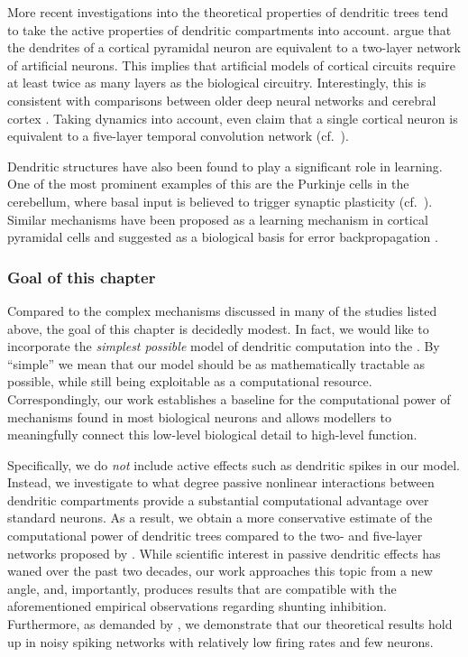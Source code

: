 More recent investigations into the theoretical properties of dendritic trees tend to take the active properties of dendritic compartments into account.
 argue that the dendrites of a cortical pyramidal neuron are equivalent to a two-layer network of artificial neurons.
This implies that artificial models of cortical circuits require at least twice as many layers as the biological circuitry.
Interestingly, this is consistent with comparisons between older deep neural networks and cerebral cortex \citep[e.g.,][]{guclu2015deep}.
Taking dynamics into account, \citet{beniaguev2021single} even claim that a single cortical neuron is equivalent to a five-layer temporal convolution network (cf.~).

Dendritic structures have also been found to play a significant role in learning.
One of the most prominent examples of this are the Purkinje cells in the cerebellum, where basal input is believed to trigger synaptic plasticity (cf.~).
Similar mechanisms have been proposed as a learning mechanism in cortical pyramidal cells and suggested as a biological basis for error backpropagation \citep{richards2019dendritic,richards2019deep}.

\subsubsection{Goal of this chapter}
Compared to the complex mechanisms discussed in many of the studies listed above, the goal of this chapter is decidedly modest.
In fact, we would like to incorporate the \emph{simplest possible} model of dendritic computation into the \NEF.
By \enquote{simple} we mean that our model should be as mathematically tractable as possible, while still being exploitable as a computational resource.
Correspondingly, our work establishes a baseline for the computational power of mechanisms found in most biological neurons and allows modellers to meaningfully connect this low-level biological detail to high-level function.

Specifically, we do \emph{not} include active effects such as dendritic spikes in our model.
Instead, we investigate to what degree passive nonlinear interactions between dendritic compartments provide a substantial computational advantage over standard \LIF neurons.
As a result, we obtain a more conservative estimate of the computational power of dendritic trees compared to the two- and five-layer networks proposed by \citet{poirazi2003pyramidal,beniaguev2021single}.
While scientific interest in passive dendritic effects has waned over the past two decades, our work approaches this topic from a new angle, and, importantly, produces results that are compatible with the aforementioned empirical observations regarding shunting inhibition.
Furthermore, as demanded by \citet{london2005dendritic}, we demonstrate that our theoretical results hold up in noisy spiking networks with relatively low firing rates and few neurons.

